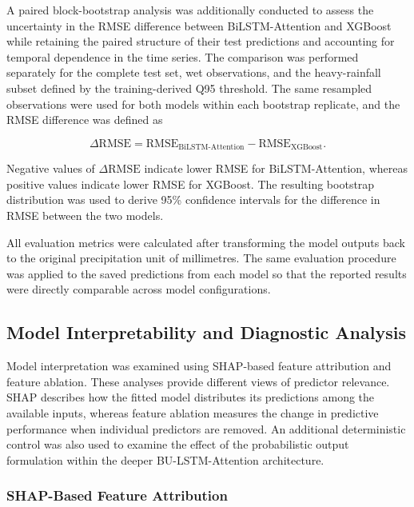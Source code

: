 \documentclass[referee,pdflatex,sn-basic]{sn-jnl}%
\theoremstyle{thmstyleone}%
\theoremstyle{thmstyletwo}%
\theoremstyle{thmstylethree}%
\begin{document}
A paired block-bootstrap analysis was additionally conducted to assess the uncertainty in the RMSE difference between BiLSTM-Attention and XGBoost while retaining the paired structure of their test predictions and accounting for temporal dependence in the time series. The comparison was performed separately for the complete test set, wet observations, and the heavy-rainfall subset defined by the training-derived Q95 threshold. The same resampled observations were used for both models within each bootstrap replicate, and the RMSE difference was defined as

\begin{equation}
\Delta \mathrm{RMSE}
=
\mathrm{RMSE}_{\mathrm{BiLSTM\text{-}Attention}}
-
\mathrm{RMSE}_{\mathrm{XGBoost}}.
\label{eq:bootstrap_delta_rmse}
\end{equation}

Negative values of $\Delta\mathrm{RMSE}$ indicate lower RMSE for BiLSTM-Attention, whereas positive values indicate lower RMSE for XGBoost. The resulting bootstrap distribution was used to derive 95\% confidence intervals for the difference in RMSE between the two models.

All evaluation metrics were calculated after transforming the model outputs back to the original precipitation unit of millimetres. The same evaluation procedure was applied to the saved predictions from each model so that the reported results were directly comparable across model configurations.
\subsection{Model Interpretability and Diagnostic Analysis}
\label{sec:diagnostic_analysis}

Model interpretation was examined using SHAP-based feature attribution and feature ablation. These analyses provide different views of predictor relevance. SHAP describes how the fitted model distributes its predictions among the available inputs, whereas feature ablation measures the change in predictive performance when individual predictors are removed. An additional deterministic control was also used to examine the effect of the probabilistic output formulation within the deeper BU-LSTM-Attention architecture.

\subsubsection{SHAP-Based Feature Attribution}
\label{sec:shap}
\end{document}
